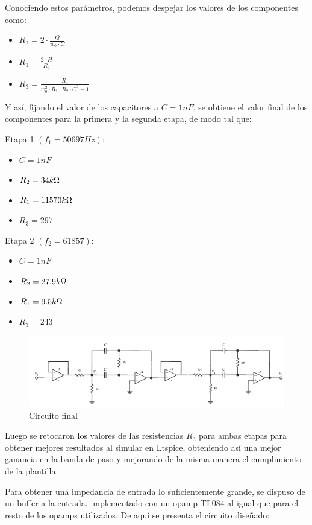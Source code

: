 \documentclass[../../tc_tp5_main.tex]{subfiles}
\begin{document}
 	Conociendo estos parámetros, podemos despejar los valores de los componentes como:
 	 	\begin{itemize}
 		\item $R_2 = 2\cdot \frac{Q}{w_0\cdot C}$
 		\item $R_1 = \frac{2\cdot H}{R_2}$
 		\item $R_3 = \frac{R_1}{w_0^2\cdot R_1\cdot R_2 \cdot C^2 - 1}$
 	\end{itemize}
 	
 	Y así, fijando el valor de los capacitores a $C = 1 nF$,  se obtiene el valor final de los componentes para la primera y la segunda etapa, de modo tal que: \par
 	 Etapa 1 $(f_1 = 50697 Hz)$:\par
 	 \par
 	\begin{itemize}
 		\item $C = 1 nF$
 		\item $R_2 = 34 k\ohm$
 		\item $R_1 = 11570 k\ohm$
 		\item $R_3 = 297$
 	\end{itemize}
 	 Etapa 2 $(f_2 = 61857)$: \par
 	 \par
 	  	\begin{itemize}
 		\item $C = 1 nF$
 		\item $R_2 = 27.9k\ohm$
 		\item $R_1 = 9.5 k\ohm$
 		\item $R_3 = 243$
 	\end{itemize}
 	
 	\begin{figure}[H]	%
	\centering
	\includegraphics[scale=0.5]{imagenes/circuito_implementado.png}
	\caption{Circuito final}
	\label{fig:ej2_circuito_implementado}
	\end{figure}
	
 	Luego se retocaron los valores de las resistencias $R_3$ para ambas etapas para obtener mejores resultados al simular en Ltspice, obteniendo así una mejor ganancia en la banda de paso y mejorando de la misma manera el cumplimiento de la plantilla.\par
 	Para obtener una impedancia de entrada lo suficientemente grande, se dispuso de un buffer a la entrada, implementado con un opamp TL084 al igual que para el resto de los opamps utilizados. 
 	De aquí se presenta el circuito diseñado: \par
 	
\end{document}
